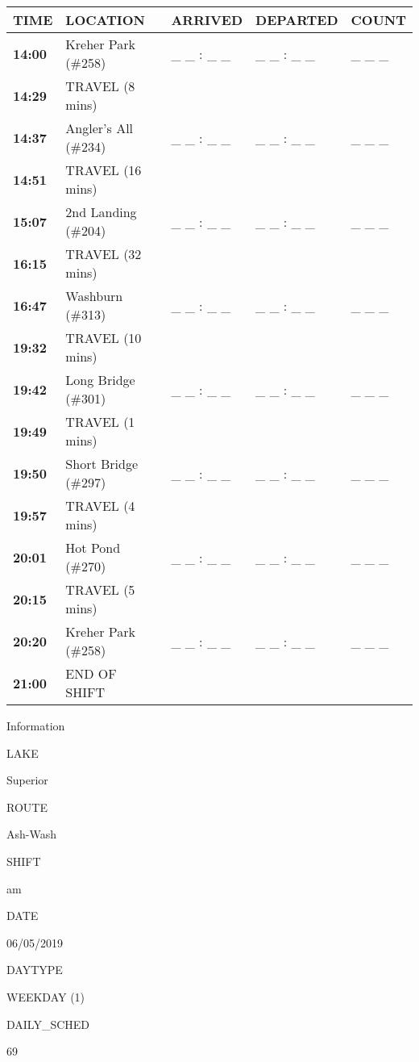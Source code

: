 \documentclass[]{article}
\begin{document}
\begin{tabular}{>{\bfseries}lllll}
\toprule
\textbf{TIME} & \textbf{LOCATION} & \textbf{ARRIVED} & \textbf{DEPARTED} & \textbf{COUNT}\\
\midrule
14:00 & Kreher Park (\#258) & \_ \_ : \_ \_ & \_ \_ : \_ \_ & \_ \_ \_\\
14:29 & TRAVEL (8 mins) &  &  & \\
14:37 & Angler's All (\#234) & \_ \_ : \_ \_ & \_ \_ : \_ \_ & \_ \_ \_\\
14:51 & TRAVEL (16 mins) &  &  & \\
15:07 & 2nd Landing (\#204) & \_ \_ : \_ \_ & \_ \_ : \_ \_ & \_ \_ \_\\
16:15 & TRAVEL (32 mins) &  &  & \\
16:47 & Washburn (\#313) & \_ \_ : \_ \_ & \_ \_ : \_ \_ & \_ \_ \_\\
19:32 & TRAVEL (10 mins) &  &  & \\
19:42 & Long Bridge (\#301) & \_ \_ : \_ \_ & \_ \_ : \_ \_ & \_ \_ \_\\
19:49 & TRAVEL (1 mins) &  &  & \\
19:50 & Short Bridge (\#297) & \_ \_ : \_ \_ & \_ \_ : \_ \_ & \_ \_ \_\\
19:57 & TRAVEL (4 mins) &  &  & \\
20:01 & Hot Pond (\#270) & \_ \_ : \_ \_ & \_ \_ : \_ \_ & \_ \_ \_\\
20:15 & TRAVEL (5 mins) &  &  & \\
20:20 & Kreher Park (\#258) & \_ \_ : \_ \_ & \_ \_ : \_ \_ & \_ \_ \_\\
21:00 & END OF SHIFT &  &  & \\
\bottomrule
\end{tabular}\newpage

Information

LAKE

Superior

ROUTE

Ash-Wash

SHIFT

am

DATE

06/05/2019

DAYTYPE

WEEKDAY (1)

DAILY\_SCHED

69

\vspace{24pt}
\end{document}
